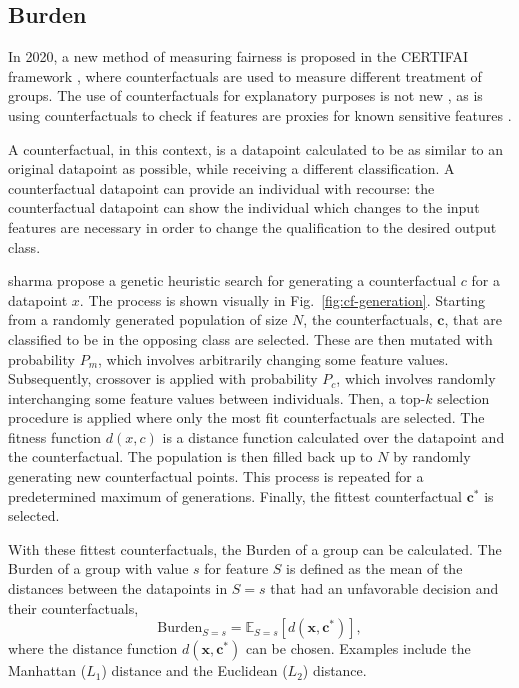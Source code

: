 \documentclass[runningheads]{llncs}
\begin{document}
\subsection{Burden}\label{sec:burden}

In 2020, a new method of measuring fairness is proposed in the CERTIFAI
framework \cite{certifai}, where counterfactuals are used to measure different
treatment of groups. The use of counterfactuals for explanatory purposes is not
new \cite{mothilal2020DICE}, as is using counterfactuals to check if features
are proxies for known sensitive features
\cite{kusner2017counterfactual-fairness}.

A counterfactual, in this context, is a datapoint calculated to be as similar
to an original datapoint as possible, while receiving a different
classification. A counterfactual datapoint can provide an individual with
\gls{recourse}: the counterfactual datapoint can show the individual which
changes to the input features are necessary in order to change the
qualification to the desired output class.

\Gls{sharma} propose a genetic heuristic search for generating a counterfactual
$c$ for a datapoint $x$. The process is shown visually in
Fig.~\ref{fig:cf-generation}. Starting from a randomly generated population of
size $N$, the counterfactuals, $\mathbf{c}$, that are classified to be in the
opposing class are selected. These are then mutated with probability $P_m$,
which involves arbitrarily changing some feature values. Subsequently,
crossover is applied with probability $P_c$, which involves randomly
interchanging some feature values between individuals. Then, a top-$k$
selection procedure is applied where only the most fit counterfactuals are
selected. The fitness function $d(x,c)$ is a distance function calculated over
the datapoint and the counterfactual. The population is then filled back up to
$N$ by randomly generating new counterfactual points. This process is repeated
for a predetermined maximum of generations. Finally, the fittest counterfactual
$\mathbf{c^*}$ is selected.

With these fittest counterfactuals, the \gls{Burden} of a group can be
calculated. The \gls{Burden} of a group with value $s$ for feature $S$ is
defined as the mean of the distances between the datapoints in $S=s$ that had
an unfavorable decision and their counterfactuals,
\begin{equation}
    \text{Burden}_{S=s} = \mathbb{E}_{S=s}[d(\mathbf{x}, \mathbf{c^*})],
\end{equation}
where the distance function $d(\mathbf{x}, \mathbf{c^*})$ can be chosen.
Examples include the Manhattan ($L_1$) distance and the Euclidean ($L_2$)
distance.
\end{document}
